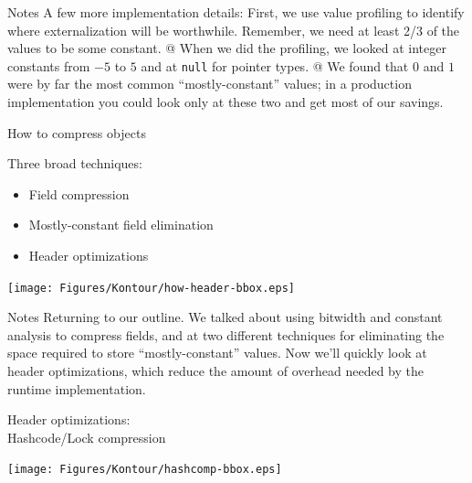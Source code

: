\documentclass[%
pdf,
colorBG,
slideColor,
nototal,
oqe
]{prosper}
\renewcommand{\yellow}{\colC}
\newenvironment{talknotes}{\begin{slide}{Notes}\tiny}{\end{slide}}
\begin{document}
\begin{talknotes}
A few more implementation details:
First, we use value profiling to identify where externalization will
be worthwhile.  Remember, we need at least 2/3 of the values to be
some constant.  @ When we did the profiling, we looked at integer
constants from $-5$ to $5$ and at {\tt null} for pointer types.
@ We found that $0$ and $1$ were by far the most common
``mostly-constant'' values;  in a production implementation you
could look only at these two and get most of our savings.
\end{talknotes}

\begin{slide}{How to compress objects} %

Three broad techniques:

\parbox[b]{2.5in}{%
\begin{itemize}%
\lightgray\renewcommand{\green}{\lightgray}%
\item Field compression
\lightgray\renewcommand{\green}{\lightgray}%
\item Mostly-constant field elimination
\headeropt\renewcommand{\green}{\headeropt}%
\item Header optimizations
\renewcommand{\green}{\yellow} %
\end{itemize}
}%
\parbox[b]{1.75in}{%
\texttt{[image: Figures/Kontour/how-header-bbox.eps]}%
}%
\end{slide}

\begin{talknotes}
Returning to our outline.  We talked about using bitwidth and constant
analysis to compress fields, and at two different techniques for
eliminating the space required to store ``mostly-constant'' values.
Now we'll quickly look at header optimizations, which reduce the amount of
overhead needed by the runtime implementation.
\end{talknotes}

\begin{slide}{Header optimizations:\\\small Hashcode/Lock compression}
\begin{center}
\vspace{.5cm}
\texttt{[image: Figures/Kontour/hashcomp-bbox.eps]}
\end{center}
\end{slide}
\end{document}
